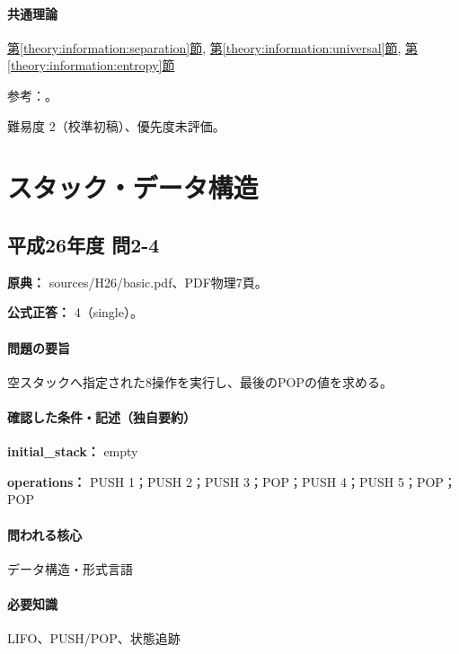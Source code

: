 \paragraph{共通理論} \hyperref[theory:information:separation]{第\ref*{theory:information:separation}節}, \hyperref[theory:information:universal]{第\ref*{theory:information:universal}節}, \hyperref[theory:information:entropy]{第\ref*{theory:information:entropy}節}

\par 参考：\cite{info_separation,info_universal,info_lossless}。

\par 難易度 2（校準初稿）、優先度未評価。

\section{スタック・データ構造}

\subsection{平成26年度 問2-4}
\label{q:h26-reg-basic-2-4}

\noindent\textbf{原典：} sources/H26/basic.pdf、PDF物理7頁。

\textbf{公式正答：} 4（single）。

\paragraph{問題の要旨} 空スタックへ指定された8操作を実行し、最後のPOPの値を求める。

\paragraph{確認した条件・記述（独自要約）}\mbox{}\par

\noindent\textbf{initial\_stack：} empty\par

\noindent\textbf{operations：} PUSH 1；PUSH 2；PUSH 3；POP；PUSH 4；PUSH 5；POP；POP\par

\paragraph{問われる核心} データ構造・形式言語

\paragraph{必要知識} LIFO、PUSH/POP、状態追跡

